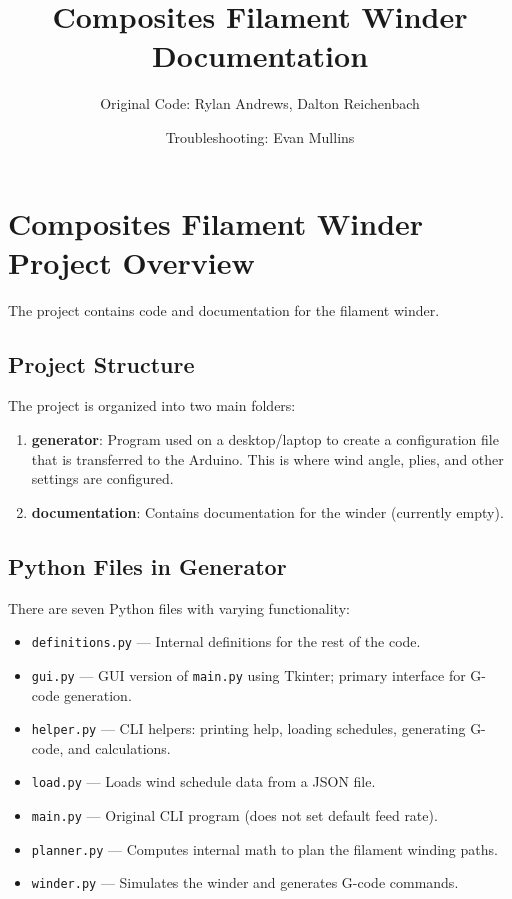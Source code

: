 \documentclass[12pt]{article}
\title{Composites Filament Winder Documentation}
\author{Original Code: Rylan Andrews, Dalton Reichenbach}
\date{Troubleshooting: Evan Mullins}
\begin{document}
\maketitle
\newpage

\section{Composites Filament Winder Project Overview}

The project contains code and documentation for the filament winder.  

\subsection{Project Structure}
The project is organized into two main folders:

\begin{enumerate}
    \item \textbf{generator}: Program used on a desktop/laptop to create a configuration file that is transferred to the Arduino. This is where wind angle, plies, and other settings are configured.
    \item \textbf{documentation}: Contains documentation for the winder (currently empty).
\end{enumerate}

\subsection{Python Files in Generator}
There are seven Python files with varying functionality:

\begin{itemize}
    \item \texttt{definitions.py} --- Internal definitions for the rest of the code.
    \item \texttt{gui.py} --- GUI version of \texttt{main.py} using Tkinter; primary interface for G-code generation.
    \item \texttt{helper.py} --- CLI helpers: printing help, loading schedules, generating G-code, and calculations.
    \item \texttt{load.py} --- Loads wind schedule data from a JSON file.
    \item \texttt{main.py} --- Original CLI program (does not set default feed rate).
    \item \texttt{planner.py} --- Computes internal math to plan the filament winding paths.
    \item \texttt{winder.py} --- Simulates the winder and generates G-code commands.
\end{itemize}
\end{document}

